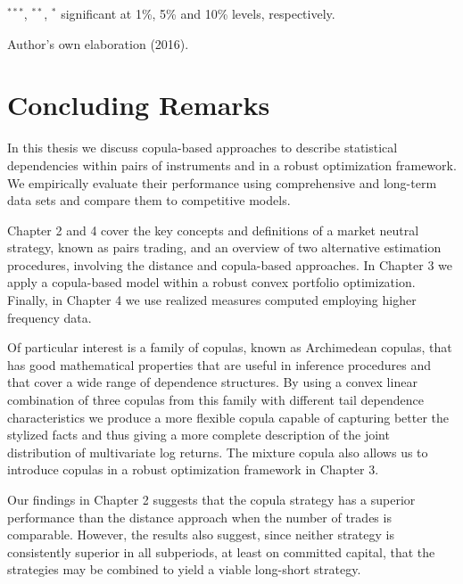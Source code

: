 \documentclass[a4paper,12pt]{report}
\begin{document}
\begin{threeparttable}[H]
\begin{tablenotes}
		\item \scriptsize $^{\ast\ast\ast}$, $^{\ast\ast}$, $^{\ast}$ significant at 1\%, 5\% and 10\% levels, respectively.
		\item Author's own elaboration (2016).
	\end{tablenotes}
	\label{tab:table209}%
\end{threeparttable}%
	
	\newpage


\chapter{Concluding Remarks}
\thispagestyle{myheadings}
\markright{}

\setlength{\baselineskip}{12pt}

\quad In this thesis we discuss copula-based approaches to describe statistical dependencies within pairs of instruments and in a robust optimization framework. We empirically evaluate their performance using comprehensive and long-term data sets and compare them to competitive models.

Chapter 2 and 4 cover the key concepts and definitions of a market neutral strategy, known as pairs trading, and an overview of two alternative estimation procedures, involving the distance and copula-based approaches. In Chapter 3 we apply a copula-based model within a robust convex portfolio optimization. Finally, in Chapter 4 we use realized measures computed employing higher frequency data.

Of particular interest is a family of copulas, known as Archimedean copulas, that has good mathematical properties that are useful in inference procedures and that cover a wide range of dependence structures. By using a convex linear combination of three copulas from this family with different tail dependence characteristics we produce a more flexible copula capable of capturing better the stylized facts and thus giving a more complete description of the joint distribution of multivariate log returns. The mixture copula also allows us to introduce copulas in a robust optimization framework in Chapter 3.

Our findings in Chapter 2 suggests that the copula strategy has a superior performance than the distance approach when the number of trades is comparable. However, the results also suggest, since neither strategy is consistently superior in all subperiods, at least on committed capital, that the strategies may be combined to yield a viable long-short strategy.
\end{document}
